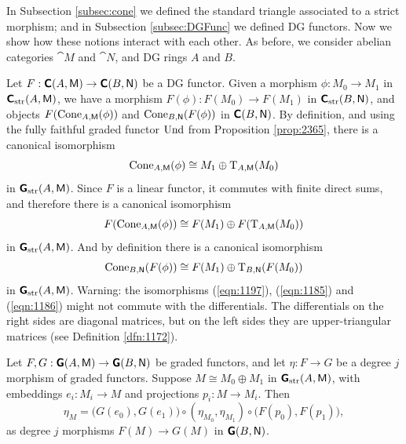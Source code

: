  \label{subsec:std-triangles}

In Subsection \ref{subsec:cone} we defined the standard triangle associated to 
a strict morphism; and in Subsection \ref{subsec:DGFunc} we defined DG 
functors. Now we show how these notions interact with each other. 
As before, we consider abelian categories $\cat{M}$ and $\cat{N}$, 
and DG rings $A$ and $B$.

Let 
$F : \boldsymbol{\mathsf{C}}(A, \operatorname{\mathsf{M}}) \to \boldsymbol{\mathsf{C}}(B, \operatorname{\mathsf{N}})$
be a DG functor. Given a morphism 
$\phi : M_0 \to M_1$ in $\boldsymbol{\mathsf{C}}_{\mathrm{str}}(A, \operatorname{\mathsf{M}})$,
we have a morphism 
$F(\phi) : F(M_0) \to F(M_1)$
in $\boldsymbol{\mathsf{C}}_{\mathrm{str}}(B, \operatorname{\mathsf{N}})$, 
and objects 
$F(\operatorname{Cone}_{A, \operatorname{\mathsf{M}}}(\phi))$ and 
$\operatorname{Cone}_{B, \operatorname{\mathsf{N}}}(F(\phi))$ 
in $\boldsymbol{\mathsf{C}}(B, \operatorname{\mathsf{N}})$.
By definition, and using the fully faithful graded functor
$\operatorname{Und}$ from Proposition \ref{prop:2365},
there is a canonical isomorphism  
\begin{equation}  \label{eqn:1197}
\operatorname{Cone}_{A, \operatorname{\mathsf{M}}}(\phi) \cong M_1 \oplus \operatorname{T}_{A, \operatorname{\mathsf{M}}}(M_0)
\end{equation}
in $\boldsymbol{\mathsf{G}}_{\mathrm{str}}(A, \operatorname{\mathsf{M}})$.
Since $F$ is a linear functor, it commutes with finite direct sums,
and therefore there is a canonical isomorphism 
\begin{equation}  \label{eqn:1185}
F(\operatorname{Cone}_{A, \operatorname{\mathsf{M}}}(\phi)) \cong F(M_1) \oplus 
F(\operatorname{T}_{A, \operatorname{\mathsf{M}}}(M_0))
\end{equation}
in $\boldsymbol{\mathsf{G}}_{\mathrm{str}}(A, \operatorname{\mathsf{M}})$. 
And by definition there is a canonical isomorphism 
\begin{equation}  \label{eqn:1186}
\operatorname{Cone}_{B, \operatorname{\mathsf{N}}}(F(\phi)) \cong F(M_1) \oplus 
\operatorname{T}_{B, \operatorname{\mathsf{N}}}(F(M_0))
\end{equation}
in $\boldsymbol{\mathsf{G}}_{\mathrm{str}}(A, \operatorname{\mathsf{M}})$.
Warning: the isomorphisms (\ref{eqn:1197}), (\ref{eqn:1185}) and 
(\ref{eqn:1186}) might not commute with the differentials. 
The differentials on the right sides are  diagonal matrices, but on the left 
sides they are upper-triangular matrices (see Definition \ref{dfn:1172}). 

\begin{lem} \label{lem:1200}
Let 
$F , G : \boldsymbol{\mathsf{G}}(A, \operatorname{\mathsf{M}}) \to \boldsymbol{\mathsf{G}}(B, \operatorname{\mathsf{N}})$
be graded functors, and let $\eta : F \to G$ be a degree $j$ 
morphism of graded functors. Suppose 
$M \cong M_0 \oplus M_1$ in $\boldsymbol{\mathsf{G}}_{\mathrm{str}}(A, \operatorname{\mathsf{M}})$, with embeddings 
$e_i : M_i \to M$ and  projections $p_i : M \to M_i$. 
Then 
\[ \eta_M = \bigl( G(e_0), G(e_1) \bigr) \circ (\eta_{M_0}, \eta_{M_1}) \circ 
\bigl( F(p_0), F(p_1) \bigr) , \]
as degree $j$ morphisms $F(M) \to G(M)$ in 
$\boldsymbol{\mathsf{G}}(B, \operatorname{\mathsf{N}})$. 
\end{lem}


